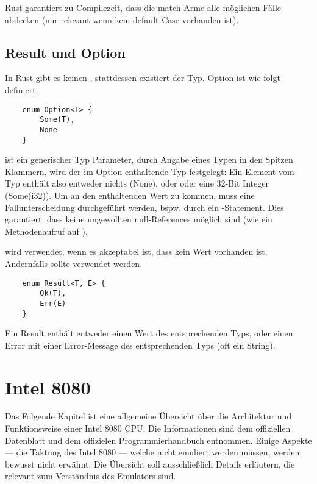 Rust garantiert zu Compilezeit, dass die match-Arme alle möglichen Fälle abdecken (nur relevant wenn kein default-Case vorhanden ist).

\subsection{Result und Option}

In Rust gibt es keinen , stattdessen existiert der  Typ. Option ist wie folgt definiert:

\begin{verbatim}
    enum Option<T> {
        Some(T),
        None
    }
\end{verbatim}

 ist ein generischer Typ Parameter, durch Angabe eines Typen in den Spitzen Klammern, wird der im Option enthaltende Typ festgelegt:
Ein Element vom Typ  enthält also entweder nichts (None), oder oder eine 32-Bit Integer (Some(i32)). Um an den enthaltenden Wert zu kommen, muss eine Fallunterscheidung durchgeführt werden, bspw. durch ein -Statement. Dies garantiert, dass keine ungewollten null-References möglich sind (wie \zB ein Methodenaufruf auf ).

 wird verwendet, wenn es akzeptabel ist, dass kein Wert vorhanden ist. Andernfalls sollte  verwendet werden.

\begin{verbatim}
    enum Result<T, E> {
        Ok(T),
        Err(E)
    }
\end{verbatim}

Ein Result enthält entweder einen Wert des entsprechenden Typs, oder einen Error mit einer Error-Message des entsprechenden Typs (oft ein String).


\section{Intel 8080}

Das Folgende Kapitel ist eine allgemeine Übersicht über die Architektur und Funktionsweise einer Intel 8080 CPU. Die Informationen sind dem offiziellen Datenblatt\cite{datasheet} und dem offizielen Programmierhandbuch\cite{progManual} entnommen.
Einige Aspekte --- \zB die Taktung des Intel 8080 --- welche nicht emuliert werden müssen, werden bewusst nicht erwähnt. Die Übersicht soll ausschließlich Details erläutern, die relevant zum Verständnis des Emulators sind.

